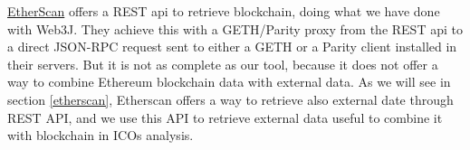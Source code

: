\href{https://etherscan.io/}{EtherScan} offers a REST api to retrieve blockchain, doing what we have done with Web3J. They achieve this with a GETH/Parity proxy from the REST api to a direct JSON-RPC request sent to either a GETH or a Parity client installed in their servers.
But it is not as complete as our tool, because it does not offer a way to combine Ethereum blockchain data with external data.
\newline
As we will see in section \ref{etherscan}, Etherscan offers a way to retrieve also external date through REST API, and we use this API to retrieve external data useful to combine it with blockchain in ICOs analysis.